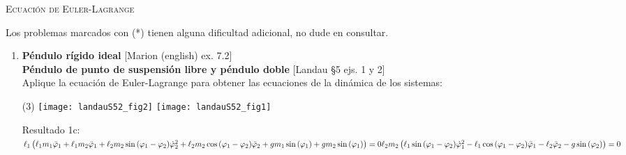 \documentclass[11pt, a4paper, twoside]{article}
\begin{document}
\begin{center}
  \textsc{\large Ecuación de Euler-Lagrange}
\end{center}

\noindent
Los problemas marcados con (*) tienen alguna dificultad adicional, no dude en consultar.
\begin{enumerate} 


\item
\textbf{Péndulo rígido ideal} [Marion (english) ex. 7.2] \\
\textbf{Péndulo de punto de suspensión libre y péndulo doble} [Landau \S5 ejs. 1 y 2]\\ 
Aplique la ecuación de Euler-Lagrange para obtener las ecuaciones de la dinámica de los sistemas:
\begin{tasks}(3)
	\task 
	\task \texttt{[image: landauS52\_fig2]}
	\task \texttt{[image: landauS52\_fig1]}
\end{tasks}
Resultado 1c:\\
\(
\ell_{1} \left(\ell_{1} m_{1} \ddot{\varphi}_{1} + \ell_{1} m_{2} \ddot{\varphi}_{1} + \ell_{2} m_{2} \sin{\left(\varphi_{1} - \varphi_{2} \right)} \dot{\varphi}_{2}^{2} + \ell_{2} m_{2} \cos{\left(\varphi_{1} - \varphi_{2} \right)} \ddot{\varphi}_{2} + g m_{1} \sin{\left(\varphi_{1} \right)} + g m_{2} \sin{\left(\varphi_{1} \right)}\right) = 0 \\[10 pt]
\ell_{2} m_{2} \left(\ell_{1} \sin{\left(\varphi_{1} - \varphi_{2} \right)} \dot{\varphi}_{1}^{2} - \ell_{1} \cos{\left(\varphi_{1} - \varphi_{2} \right)} \ddot{\varphi}_{1} - \ell_{2} \ddot{\varphi}_{2} - g \sin{\left(\varphi_{2} \right)}\right) = 0
\)



\end{enumerate}
\end{document}
